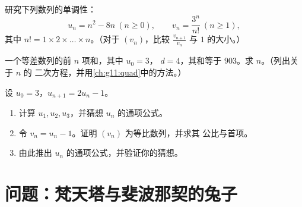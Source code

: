 \begin{exercise}[$\star\star$]\label{exo:g11:seq:9}
研究下列数列的单调性：
\[
u_n = n^2 - 8n \ (n \geq 0), \qquad
v_n = \frac{3^n}{n!}\ (n \geq 1),
\]
其中 $n! = 1 \times 2 \times \dots \times n$。（对于 $(v_n)$，比较
$\frac{v_{n+1}}{v_n}$ 与 $1$ 的大小。）
\end{exercise}

\begin{exercise}[$\star\star$]\label{exo:g11:seq:10}
一个等差数列的前 $n$ 项和，其中 $u_0 = 3$，
$d = 4$，其和等于 $903$。求 $n$。（列出关于 $n$ 的
二次方程，并用\cref{ch:g11:quad}中的方法。）
\end{exercise}

\begin{exercise}[$\star\star\star$]\label{exo:g11:seq:11}
设 $u_0 = 3$，$u_{n+1} = 2u_n - 1$。
\begin{enumerate}
  \item 计算 $u_1, u_2, u_3$，并猜想 $u_n$ 的通项公式。
  \item 令 $v_n = u_n - 1$。证明 $(v_n)$ 为等比数列，并求其
        公比与首项。
  \item 由此推出 $u_n$ 的通项公式，并验证你的猜想。
\end{enumerate}
\end{exercise}

\section{问题：梵天塔与斐波那契的兔子}

